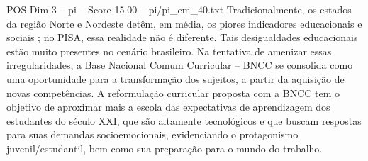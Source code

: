 \begin{textsample}{POS Dim 3 – pi – Score 15.00 – pi/pi\_em\_40.txt}
Tradicionalmente, os estados da região Norte e Nordeste detêm, em média, os piores indicadores educacionais e sociais ; no PISA, essa realidade não é diferente.
Tais desigualdades educacionais estão muito presentes no cenário brasileiro.
Na tentativa de amenizar essas irregularidades, a Base Nacional Comum Curricular – BNCC se consolida como uma oportunidade para a transformação dos sujeitos, a partir da aquisição de novas competências.
A reformulação curricular proposta com a BNCC tem o objetivo de aproximar mais a escola das expectativas de aprendizagem dos estudantes do século XXI, que são altamente tecnológicos e que buscam respostas para suas demandas socioemocionais, evidenciando o protagonismo juvenil/estudantil, bem como sua preparação para o mundo do trabalho.

\end{textsample}
